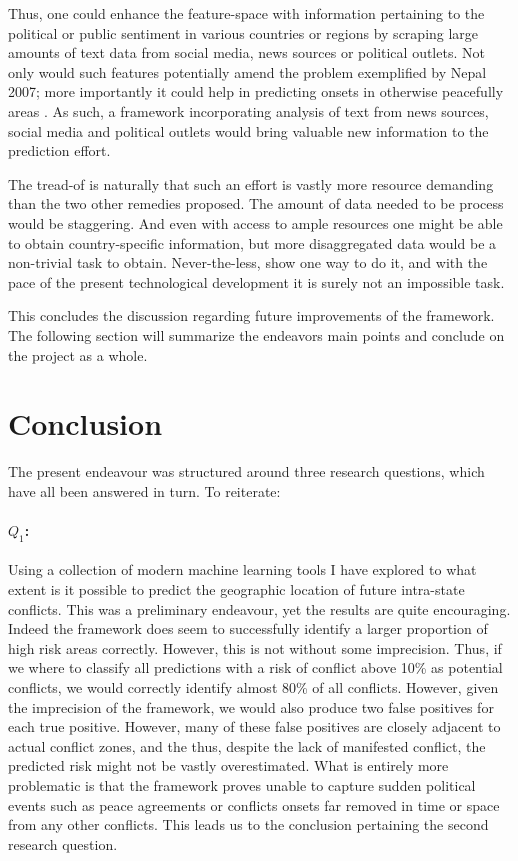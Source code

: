 \documentclass[a4paper]{article}
\begin{document}
Thus, one could enhance the feature-space with information pertaining to the political or public sentiment in various countries or regions by scraping large amounts of text data from social media, news sources or political outlets. Not only would such features potentially amend the problem exemplified by Nepal 2007; more importantly it could help in predicting onsets in otherwise peacefully areas \cite{mueller_2016}. As such, a framework incorporating analysis of text from news sources, social media and political outlets would bring valuable new information to the prediction effort.\par

The tread-of is naturally that such an effort is vastly more resource demanding than the two other remedies proposed. The amount of data needed to be process would be staggering. And even with access to ample resources one might be able to obtain country-specific information, but more disaggregated data would be a non-trivial task to obtain. Never-the-less, \cite{mueller_2016} show one way to do it, and with the pace of the present technological development it is surely not an impossible task.\par 

This concludes the discussion regarding future improvements of the framework. The following section will summarize the endeavors main points and conclude on the project as a whole.\par

\section{Conclusion}

The present endeavour was structured around three research questions, which have all been answered in turn. To reiterate:

\paragraph{$Q_1$:} Using a collection of modern machine learning tools I have explored to what extent is it possible to predict the geographic location of future intra-state conflicts. This was a preliminary endeavour, yet the results are quite encouraging. Indeed the framework does seem to successfully identify a larger proportion of high risk areas correctly. However, this is not without some imprecision. Thus, if we where to classify all predictions with a risk of conflict above 10\% as potential conflicts, we would correctly identify almost 80\% of all conflicts. However, given the imprecision of the framework, we would also produce two false positives for each true positive. However, many of these false positives are closely adjacent to actual conflict zones, and the thus, despite the lack of manifested conflict, the predicted risk might not be vastly overestimated. What is entirely more problematic is that the framework proves unable to capture sudden political events such as peace agreements or conflicts onsets far removed in time or space from any other conflicts. This leads us to the conclusion pertaining the second research question.\par
\end{document}
